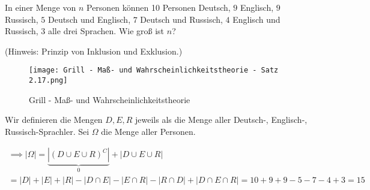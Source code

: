 
\begin{exercise}

In einer Menge von $n$ Personen können 10 Personen Deutsch, $9$ Englisch, $9$ Russisch, $5$ Deutsch und Englisch, $7$ Deutsch und Russisch, $4$ Englisch und Russisch, $3$ alle drei Sprachen.
Wie groß ist $n$?

(Hinweis: Prinzip von Inklusion und Exklusion.)

\end{exercise}


\begin{solution}

\phantom{}


\begin{figure}[h!]
  \centering
  \texttt{[image: Grill - Maß- und Wahrscheinlichkeitstheorie - Satz 2.17.png]}
  \caption{Grill - Maß- und Wahrscheinlichkeitstheorie}
\end{figure}

Wir definieren die Mengen $D, E, R$ jeweils als die Menge aller Deutsch-, Englisch-, Russisch-Sprachler.
Sei $\Omega$ die Menge aller Personen.

\begin{multline*}
  \implies
  |\Omega|
  =
  \underbrace{|(D \cup E \cup R)^C|}_0
  +
  |D \cup E \cup R| \\
  =
  |D| + |E| + |R| - |D \cap E| - |E \cap R| - |R \cap D| + |D \cap E \cap R|
  =
  10 + 9 + 9 - 5 - 7 - 4 + 3
  =
  15
\end{multline*}

\end{solution}

